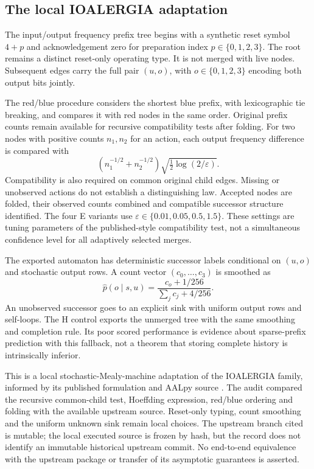 \subsection{The local IOALERGIA adaptation}
The input/output frequency prefix tree begins with a synthetic reset symbol $4+p$ and acknowledgement zero for preparation index $p\in\{0,1,2,3\}$. The root remains a distinct reset-only operating type. It is not merged with live nodes. Subsequent edges carry the full pair $(u,o)$, with $o\in\{0,1,2,3\}$ encoding both output bits jointly.

The red/blue procedure considers the shortest blue prefix, with lexicographic tie breaking, and compares it with red nodes in the same order. Original prefix counts remain available for recursive compatibility tests after folding. For two nodes with positive counts $n_1,n_2$ for an action, each output frequency difference is compared with
\begin{equation}\label{eq:compatibility}
 \left(n_1^{-1/2}+n_2^{-1/2}\right)
 \sqrt{\tfrac12\log(2/\varepsilon)}.
\end{equation}
Compatibility is also required on common original child edges. Missing or unobserved actions do not establish a distinguishing law. Accepted nodes are folded, their observed counts combined and compatible successor structure identified. The four E variants use $\varepsilon\in\{0.01,0.05,0.5,1.5\}$. These settings are tuning parameters of the published-style compatibility test, not a simultaneous confidence level for all adaptively selected merges.

The exported automaton has deterministic successor labels conditional on $(u,o)$ and stochastic output rows. A count vector $(c_0,\ldots,c_3)$ is smoothed as
\begin{equation}
 \widehat p(o\mid s,u)=\frac{c_o+1/256}{\sum_jc_j+4/256}.
\end{equation}
An unobserved successor goes to an explicit sink with uniform output rows and self-loops. The H control exports the unmerged tree with the same smoothing and completion rule. Its poor scored performance is evidence about sparse-prefix prediction with this fallback, not a theorem that storing complete history is intrinsically inferior.

This is a local stochastic-Mealy-machine adaptation of the IOALERGIA family, informed by its published formulation and AALpy source \cite{Mao2012MDP,MaoJaeger2012,AALpySource}. The audit compared the recursive common-child test, Hoeffding expression, red/blue ordering and folding with the available upstream source. Reset-only typing, count smoothing and the uniform unknown sink remain local choices. The upstream branch cited is mutable; the local executed source is frozen by hash, but the record does not identify an immutable historical upstream commit. No end-to-end equivalence with the upstream package or transfer of its asymptotic guarantees is asserted.

